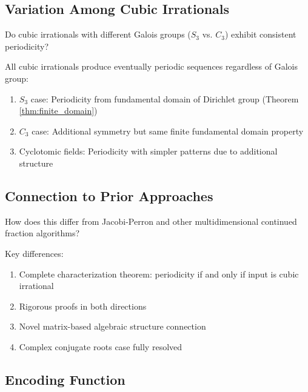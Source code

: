 \subsection{Variation Among Cubic Irrationals}

\begin{objection}
Do cubic irrationals with different Galois groups ($S_3$ vs. $C_3$) exhibit consistent periodicity?
\end{objection}

\begin{response}
All cubic irrationals produce eventually periodic sequences regardless of Galois group:
\begin{enumerate}
\item $S_3$ case: Periodicity from fundamental domain of Dirichlet group (Theorem \ref{thm:finite_domain})
\item $C_3$ case: Additional symmetry but same finite fundamental domain property
\item Cyclotomic fields: Periodicity with simpler patterns due to additional structure
\end{enumerate}
\end{response}

\subsection{Connection to Prior Approaches}

\begin{objection}
How does this differ from Jacobi-Perron and other multidimensional continued fraction algorithms?
\end{objection}

\begin{response}
Key differences:
\begin{enumerate}
\item Complete characterization theorem: periodicity if and only if input is cubic irrational
\item Rigorous proofs in both directions
\item Novel matrix-based algebraic structure connection
\item Complex conjugate roots case fully resolved
\end{enumerate}
\end{response}

\subsection{Encoding Function}

